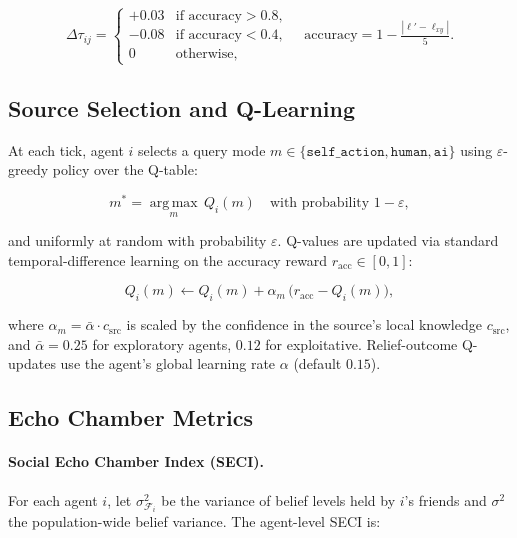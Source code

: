\documentclass[pdflatex,sn-apa]{sn-jnl}%
\begin{document}
\begin{equation}
  \Delta\tau_{ij} =
  \begin{cases}
   +0.03 & \text{if accuracy} > 0.8,\\
   -0.08 & \text{if accuracy} < 0.4,\\
    0    & \text{otherwise,}
  \end{cases}
  \quad
  \text{accuracy} = 1 - \tfrac{|\ell'- \ell_{xy}|}{5}.
\end{equation}

\subsection{Source Selection and Q-Learning}

At each tick, agent $i$ selects a query mode
$m\in\{\texttt{self\_action},\texttt{human},\texttt{ai}\}$
using $\varepsilon$-greedy policy over the Q-table:

\begin{equation}
  m^* = \operatorname*{arg\,max}_{m}\, Q_i(m)
  \quad\text{with probability }1-\varepsilon,
\end{equation}

and uniformly at random with probability $\varepsilon$.
Q-values are updated via standard temporal-difference learning
on the accuracy reward $r_\mathrm{acc}\in[0,1]$:

\begin{equation}
  Q_i(m) \leftarrow Q_i(m) + \alpha_m \, \bigl(r_\mathrm{acc} - Q_i(m)\bigr),
\end{equation}

where $\alpha_m = \bar\alpha \cdot c_\mathrm{src}$ is scaled by the
confidence in the source's local knowledge $c_\mathrm{src}$, and
$\bar\alpha=0.25$ for exploratory agents, $0.12$ for exploitative.
Relief-outcome Q-updates use the agent's global learning rate
$\alpha$ (default $0.15$).

\subsection{Echo Chamber Metrics}

\paragraph{Social Echo Chamber Index (SECI).}
For each agent $i$, let $\sigma^2_{\mathcal{F}_i}$ be the variance
of belief levels held by $i$'s friends and $\sigma^2$ the
population-wide belief variance.  The agent-level SECI is:
\end{document}
